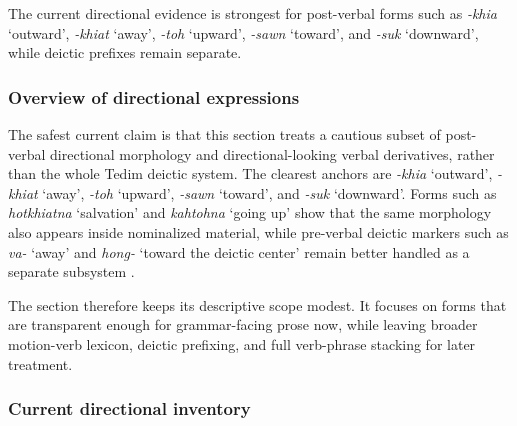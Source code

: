 \documentclass[
  11pt,
  a4paper,
]{article}
\newcommand{\tdim}[1]{\textit{#1}}
\newcommand{\glossquote}[1]{`#1'}
\begin{document}
The current directional evidence is strongest for post-verbal forms such
as \tdim{-khia} \glossquote{outward}, \tdim{-khiat} \glossquote{away},
\tdim{-toh} \glossquote{upward}, \tdim{-sawn} \glossquote{toward}, and
\tdim{-suk} \glossquote{downward}, while deictic prefixes remain
separate.

\subsubsection{Overview of directional
expressions}\label{overview-of-directional-expressions}

The safest current claim is that this section treats a cautious subset
of post-verbal directional morphology and directional-looking verbal
derivatives, rather than the whole Tedim deictic system. The clearest
anchors are \tdim{-khia} \glossquote{outward}, \tdim{-khiat}
\glossquote{away}, \tdim{-toh} \glossquote{upward}, \tdim{-sawn}
\glossquote{toward}, and \tdim{-suk} \glossquote{downward}. Forms such
as \tdim{hotkhiatna} \glossquote{salvation} and \tdim{kahtohna}
\glossquote{going up} show that the same morphology also appears inside
nominalized material, while pre-verbal deictic markers such as
\tdim{va-} \glossquote{away} and \tdim{hong-}
\glossquote{toward the deictic center} remain better handled as a
separate subsystem
\citep{henderson1965, zamngaihcing2017, otsuka_kurabe_directional_affixes}.

The section therefore keeps its descriptive scope modest. It focuses on
forms that are transparent enough for grammar-facing prose now, while
leaving broader motion-verb lexicon, deictic prefixing, and full
verb-phrase stacking for later treatment.

\subsubsection{Current directional
inventory}\label{current-directional-inventory}
\end{document}
